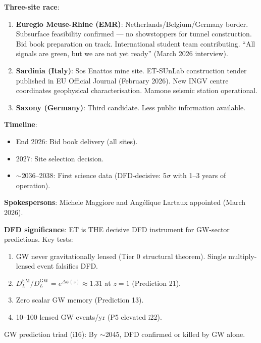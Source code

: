 \documentclass[11pt,a4paper]{article}
\begin{document}
\begin{tcolorbox}[colback=blue!5!white, colframe=blue!60!black,
  title={Einstein Telescope: Updated Timeline (March 2026)}]

\textbf{Three-site race}:
\begin{enumerate}
\item \textbf{Euregio Meuse-Rhine (EMR)}: Netherlands/Belgium/Germany border. Subsurface feasibility confirmed --- no showstoppers for tunnel construction. Bid book preparation on track. International student team contributing. ``All signals are green, but we are not yet ready'' (March 2026 interview).
\item \textbf{Sardinia (Italy)}: Sos Enattos mine site. ET-SUnLab construction tender published in EU Official Journal (February 2026). New INGV centre coordinates geophysical characterisation. Mamone seismic station operational.
\item \textbf{Saxony (Germany)}: Third candidate. Less public information available.
\end{enumerate}

\textbf{Timeline}:
\begin{itemize}
\item End 2026: Bid book delivery (all sites).
\item 2027: Site selection decision.
\item $\sim$2036--2038: First science data (DFD-decisive: 5$\sigma$ with 1--3 years of operation).
\end{itemize}

\textbf{Spokespersons}: Michele Maggiore and Ang\'elique Lartaux appointed (March 2026).

\textbf{DFD significance}: ET is THE decisive DFD instrument for GW-sector predictions. Key tests:
\begin{enumerate}
\item GW never gravitationally lensed (Tier 0 structural theorem). Single multiply-lensed event falsifies DFD.
\item $D_L^{\text{EM}} / D_L^{\text{GW}} = e^{\Delta\psi(z)} \approx 1.31$ at $z = 1$ (Prediction 21).
\item Zero scalar GW memory (Prediction 13).
\item 10--100 lensed GW events/yr (P5 elevated i22).
\end{enumerate}

GW prediction triad (i16): By $\sim$2045, DFD confirmed or killed by GW alone.
\end{tcolorbox}
\end{document}
